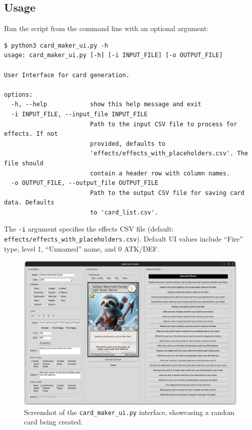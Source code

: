 \subsection{Usage}
Run the script from the command line with an optional argument:
\begin{lstlisting}[style=terminalstyle]
$ python3 card_maker_ui.py -h
usage: card_maker_ui.py [-h] [-i INPUT_FILE] [-o OUTPUT_FILE]

User Interface for card generation.

options:
  -h, --help            show this help message and exit
  -i INPUT_FILE, --input_file INPUT_FILE
                        Path to the input CSV file to process for effects. If not
                        provided, defaults to
                        'effects/effects_with_placeholders.csv'. The file should
                        contain a header row with column names.
  -o OUTPUT_FILE, --output_file OUTPUT_FILE
                        Path to the output CSV file for saving card data. Defaults
                        to 'card_list.csv'.
\end{lstlisting}
The \texttt{-i} argument specifies the effects CSV file (default: \texttt{effects/effects\_with\_placeholders.csv}). Default UI values include ``Fire'' type, level 1, ``Unnamed'' name, and 0 ATK/DEF.

\begin{figure}[h]
	\centering
	\includegraphics[width=\textwidth]{images/ui_sample.png}
	\caption{Screenshot of the \texttt{card\_maker\_ui.py} interface, showcasing a random card being created.}
	\label{fig:card_maker_ui_screenshot}
\end{figure}

